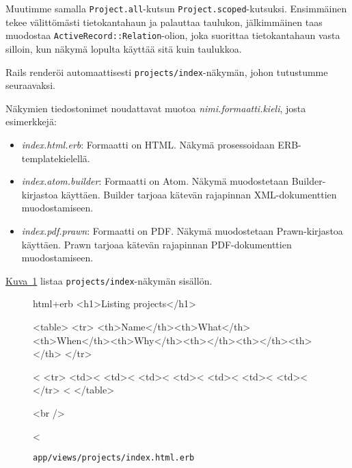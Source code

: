 \documentclass{article}
\newenvironment{myfigure}[1][tbp]{
  \begin{figure}[#1]
    \centering
    \begin{lrbox}{\myfigurebox}
      \begin{minipage}{\textwidth}
}{
      \end{minipage}
    \end{lrbox}
    \colorbox{blue!4}{\usebox{\myfigurebox}}
  \end{figure}
}
\newcommand{\myref}[2]{\hyperref[#2]{#1~\ref*{#2}}}
\begin{document}
Muutimme samalla \texttt{Project.all}-kutsun \texttt{Project.scoped}-kutsuksi.
Ensimmäinen tekee välittömästi tietokantahaun ja palauttaa taulukon,
jälkimmäinen taas muodostaa \texttt{ActiveRecord::Relation}-olion, joka
suorittaa tietokantahaun vasta silloin, kun näkymä lopulta käyttää sitä kuin
taulukkoa.

Rails renderöi automaattisesti \texttt{projects/index}-näkymän, johon
tutustumme seuraavaksi.

Näkymien tiedostonimet noudattavat muotoa \emph{nimi.formaatti.kieli}, josta
esimerkkejä:

\begin{itemize}
\item
\emph{index.html.erb}: Formaatti on HTML. Näkymä prosessoidaan
ERB-templatekielellä.

\item
\emph{index.atom.builder}: Formaatti on Atom. Näkymä muodostetaan
Builder-kirjastoa käyttäen. Builder tarjoaa kätevän rajapinnan XML-dokumenttien
muodostamiseen.

\item
\emph{index.pdf.prawn}: Formaatti on PDF. Näkymä muodostetaan Prawn-kirjastoa
käyttäen. Prawn tarjoaa kätevän rajapinnan PDF-dokumenttien muodostamiseen.
\end{itemize}

\begin{samepage}
\myref{Kuva}{fig:projects-index-view-00} listaa \texttt{projects/index}-näkymän
sisällön.

\begin{myfigure}[H]
\caption{\texttt{app/views/projects/index.html.erb}}
\label{fig:projects-index-view-00}

\begin{pygmented}{html+erb}
<h1>Listing projects</h1>

<table>
  <tr>
    <th>Name</th><th>What</th><th>When</th><th>Why</th><th></th><th></th><th></th>
  </tr>

<%
  <tr>
    <td><%
    <td><%
    <td><%
    <td><%
    <td><%
    <td><%
    <td><%
  </tr>
<%
</table>

<br />

<%
\end{pygmented}
\end{myfigure}
\end{samepage}
\end{document}
